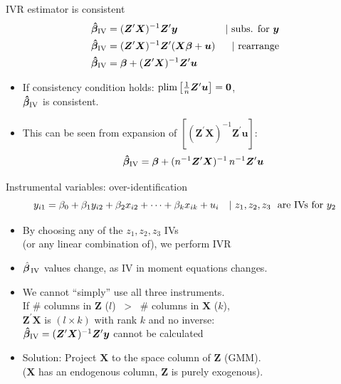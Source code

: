 \documentclass[usenames,dvipsnames]{beamer}
\begin{document}
\begin{frame}{IVR estimator is consistent}
\begin{align*}
    \bm{\hat{\beta}}_{\textnormal{IV}} &= (\bm{Z}^{\prime}\bm{X})^{-1} \bm{Z}^{\prime}\bm{y} &|~ \textnormal{subs. for~} \bm{y} \\
     \bm{\hat{\beta}}_{\textnormal{IV}} &= (\bm{Z}^{\prime}\bm{X})^{-1} \bm{Z}^{\prime}(\bm{X \beta} + \bm{u}) &|~ \textnormal{rearrange} \\
    \bm{\hat{\beta}}_{\textnormal{IV}} &= \bm{\beta} + (\bm{Z}^{\prime}\bm{X})^{-1} \bm{Z}^{\prime}\bm{u}
    \end{align*}
\begin{itemize}
    \medskip
    \item If consistency condition holds: $\textnormal{plim}\left[\frac{1}{n}\bm{Z}^{\prime}\bm{u}\right]= \bm{0}$, \\$\bm{\hat{\beta}}_{\textnormal{IV}}$ is consistent.
    \medskip
    \item This can be seen from expansion of $[(\bm{Z}^{\prime}\bm{X})^{-1} \bm{Z}^{\prime}\bm{u}] $:
    $$
    \bm{\hat{\beta}}_{\textnormal{IV}} = \bm{\beta} + (n^{-1}\bm{Z}^{\prime}\bm{X})^{-1}\, n^{-1}\bm{Z}^{\prime}\bm{u}
    $$
\end{itemize}
\end{frame}
\begin{frame}{Instrumental variables: over-identification}
\vspace{-0.5cm}
$$y_{i1}=\beta_0 + \beta_1 y_{i2} + \beta_2 x_{i2} + \dots + \beta_k x_{ik} + u_{i} \quad|~z_1, z_2, z_3 \textnormal{~ are IVs for } y_2$$

\begin{itemize}
    \item By choosing any of the $z_1, z_2, z_3$ IVs \\(or any linear combination of), we perform IVR
    \item $\hat{\bm{\beta}}_{\textnormal{\,IV}}$ values change, as IV  in moment equations changes.
    \item We cannot ``simply'' use all three instruments. \\If \# columns in $\bm{Z}$ ($l$) ~>~ \# columns in $\bm{X}$ ($k$),\\
    $\bm{Z}^{\prime}\bm{X}$ is $(l\times k)$ with rank $k$ and no inverse:
    \\$\bm{\hat{\beta}}_{\textnormal{IV}} = (\bm{Z}^{\prime}\bm{X})^{-1} \bm{Z}^{\prime}\bm{y}$ cannot be calculated \\
    \medskip
    \item Solution: Project $\bm{X}$ to the space column of $\bm{Z}$ (GMM).\\
    ($\bm{X}$ has an endogenous column, $\bm{Z}$ is purely exogenous).
\end{itemize}
\end{frame}
\end{document}
